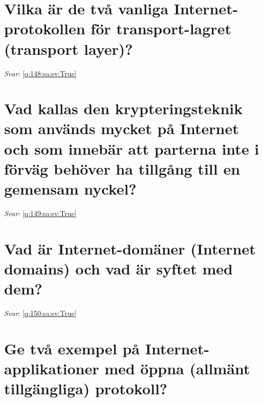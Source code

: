 \documentclass[a4paper,11pt,oneside]{book}
\begin{document}
\begin{sloppypar}
\section{Vilka \"ar de tv\r{a} vanliga Internet-protokollen f\"or transport-lagret (transport layer)?}

\label{q:148:sa:sv:False}

\vspace{2cm}

\noindent\makebox[\textwidth]{\hrulefill}

\vspace{1cm}

\textit{Svar}: \autoref{q:148:sa:sv:True}



\section{Vad kallas den krypteringsteknik som anv\"ands mycket p\r{a} Internet och som inneb\"ar att parterna inte i f\"orv\"ag beh\"over ha tillg\r{a}ng till en gemensam nyckel?}

\label{q:149:sa:sv:False}

\vspace{2cm}

\noindent\makebox[\textwidth]{\hrulefill}

\vspace{1cm}

\textit{Svar}: \autoref{q:149:sa:sv:True}



\section{Vad \"ar Internet-dom\"aner (Internet domains) och vad \"ar syftet med dem?}

\label{q:150:sa:sv:False}

\vspace{2cm}

\noindent\makebox[\textwidth]{\hrulefill}

\vspace{1cm}

\textit{Svar}: \autoref{q:150:sa:sv:True}



\section{Ge tv\r{a} exempel p\r{a} Internet-applikationer med \"oppna (allm\"ant tillg\"angliga) protokoll?}


\end{sloppypar}
\end{document}
